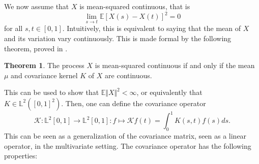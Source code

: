 \documentclass[10pt, a4paper]{report}
\newcommand{\E}[0]{\mathbb{E}}
\newcommand{\Ll}[0]{\mathbb{L}}
\newcommand{\K}[0]{\mathcal{K}}
\theoremstyle{definition}
\newtheorem{theorem}{Theorem}
\theoremstyle{remark}
\begin{document}
We now assume that $X$ is mean-squared continuous, that is 
$$\lim_{s\to t} \E[X(s)-X(t)]^2 = 0$$
for all $s,t \in [0,1]$. Intuitively, this is equivalent to saying that the mean of $X$ and its variation vary continuously. This is made formal by the following theorem, proved in \cite[Theorem 7.2.4]{found}.
\begin{theorem}
	The process $X$ is mean-squared continuous if and only if the mean $\mu$ and covariance kernel $K$ of $X$ are continuous.
\end{theorem}
This can be used to show that $\E\Vert X \Vert^2 < \infty$, or equivalently that $K \in \Ll^2([0,1]^2)$. Then, one can define the covariance operator
$$\K:\Ll^2[0,1] \to \Ll^2[0,1]: f \mapsto \K f(t) = \int_{0}^{1}K(s,t)f(s)ds.$$
This can be seen as a generalization of the covariance matrix, seen as a linear operator, in the multivariate setting. The covariance operator has the following properties:
\end{document}
